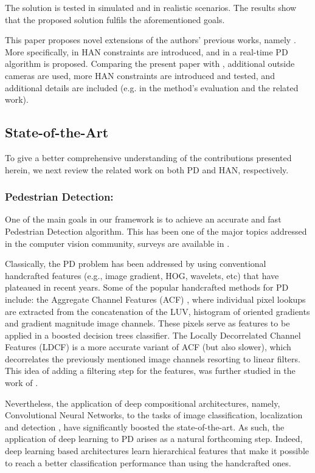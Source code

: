 \documentclass[5p,time]{elsarticle}
\begin{document}
The solution is tested in simulated and in realistic scenarios. The results show that the proposed solution fulfils the
aforementioned goals.

This paper proposes novel extensions of the authors' previous works, namely \cite{mateus:2015,ribeiro2017ICARSC}.
More specifically, in \cite{mateus:2015} HAN constraints are introduced, and in \cite{ribeiro2017ICARSC} a real-time PD algorithm is proposed. Comparing the present paper with \cite{ribeiro2017ICARSC}, additional outside cameras are used, more HAN constraints are introduced and tested, and additional details are included (e.g. in the method's evaluation and the related work).

\subsection{State-of-the-Art}

To give a better comprehensive understanding of the contributions presented herein, we next review the related work on both PD and HAN, respectively.

\subsubsection{Pedestrian Detection:} One of the main goals in our framework is to achieve an accurate and fast Pedestrian Detection algorithm. This has been one of the major topics addressed in the computer vision community, surveys are available in \cite{DollarPAMI2012,BenensonECCV2014}.

Classically, the PD problem has been addressed by using conventional handcrafted features (e.g., image gradient, HOG, wavelets, etc) that have plateaued in recent years. Some of the popular handcrafted methods for PD include: the Aggregate Channel Features (ACF) \cite{DollarPAMI2014}, where individual pixel lookups are extracted from the concatenation of the LUV, histogram of oriented gradients and gradient magnitude image channels. These pixels serve as features to be applied in a boosted decision trees classifier. The Locally Decorrelated Channel Features (LDCF) \cite{NamNIPS2014} is a more accurate variant of ACF (but also slower), which decorrelates the previously mentioned image channels resorting to linear filters. This idea of adding a filtering step for the features, was further studied in the work of \cite{Zhang2015Cvpr}.

Nevertheless, the application of deep compositional architectures, namely, Convolutional Neural Networks, to the tasks of image classification, localization and detection \cite{RussakovskyIJCV2015}, have significantly boosted the state-of-the-art.
As such, the application of deep learning to PD arises as a natural forthcoming step.
Indeed, deep learning based architectures learn hierarchical features \cite{Goodfellow-et-al-2016-Book} that make it possible to reach a better classification performance than using the handcrafted ones.
\end{document}
